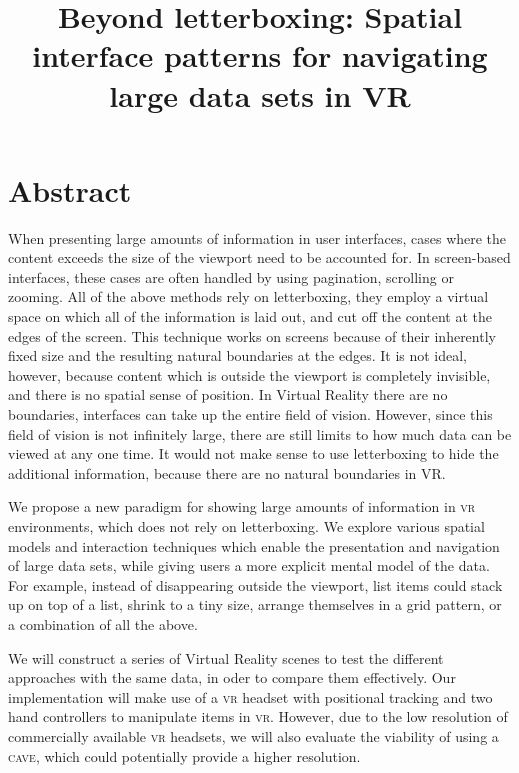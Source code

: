



\title{Beyond letterboxing: Spatial interface patterns for navigating large data sets in VR}\maketitle

\section{Abstract}
When presenting large amounts of information in user interfaces, cases where the content exceeds the size of the viewport need to be accounted for. In screen-based interfaces, these cases are often handled by using pagination, scrolling or zooming. All of the above methods rely on letterboxing, \ie they employ a virtual space on which all of the information is laid out, and cut off the content at the edges of the screen. This technique works on screens because of their inherently fixed size and the resulting natural boundaries at the edges. It is not ideal, however, because content which is outside the viewport is completely invisible, and there is no spatial sense of position. In Virtual Reality there are no boundaries, interfaces can take up the entire field of vision. However, since this field of vision is not infinitely large, there are still limits to how much data can be viewed at any one time. It would not make sense to use letterboxing to hide the additional information, because there are no natural boundaries in VR.

We propose a new paradigm for showing large amounts of information in \textsc{vr} environments, which does not rely on letterboxing. We explore various spatial models and interaction techniques which enable the presentation and navigation of large data sets, while giving users a more explicit mental model of the data. For example, instead of disappearing outside the viewport, list items could stack up on top of a list, shrink to a tiny size, arrange themselves in a grid pattern, or a combination of all the above.

We will construct a series of Virtual Reality scenes to test the different approaches with the same data, in oder to compare them effectively. Our implementation will make use of a \textsc{vr} headset with positional tracking and two hand controllers to manipulate items in \textsc{vr}. However, due to the low resolution of commercially available \textsc{vr} headsets, we will also evaluate the viability of using a \textsc{cave}, which could potentially provide a higher resolution.

